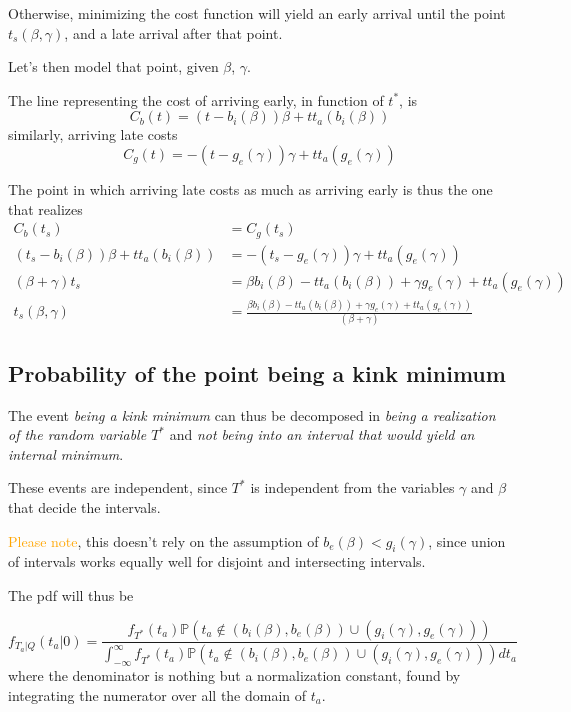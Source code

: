 \documentclass{article}
\begin{document}
Otherwise, minimizing the cost function will yield an early arrival until the point \(t_s(\beta, \gamma)\), and a late arrival after that point.

Let's then model that point, given \(\beta\), \(\gamma\).

The line representing the cost of arriving early, in function of \(t^*\), is
\begin{equation*}
  C_b(t) = (t - b_i(\beta))\beta + tt_a(b_i(\beta))
\end{equation*}
similarly, arriving late costs
\begin{equation*}
  C_g(t) = -(t - g_e(\gamma))\gamma + tt_a(g_e(\gamma))
\end{equation*}

The point in which arriving late costs as much as arriving early is thus the one that realizes
\begin{align*}
  C_b(t_s) & = C_g(t_s) \\
  (t_s - b_i(\beta))\beta + tt_a(b_i(\beta)) & = -(t_s - g_e(\gamma))\gamma + tt_a(g_e(\gamma)) \\
  (\beta + \gamma)t_s & = \beta b_i(\beta) - tt_a(b_i(\beta)) + \gamma g_e(\gamma) + tt_a(g_e(\gamma)) \\
  t_s(\beta, \gamma) & = \frac{\beta b_i(\beta) - tt_a(b_i(\beta)) + \gamma g_e(\gamma) + tt_a(g_e(\gamma))}{(\beta + \gamma)}
\end{align*}

\subsection{Probability of the point being a kink minimum}

The event \textit{being a kink minimum} can thus be decomposed in \textit{being a realization of the random variable \(T^*\)} and \textit{not being into an interval that would yield an internal minimum}.

These events are independent, since \(T^*\) is independent from the variables \(\gamma\) and \(\beta\) that decide the intervals.

\textcolor{orange}{Please note}, this doesn't rely on the assumption of \(b_e(\beta) < g_i(\gamma)\),
since union of intervals works equally well for disjoint and intersecting intervals.

The pdf will thus be

\begin{equation}
  \label{eq:prob_kink}
    f_{T_a | Q}(t_a | 0) = \frac{f_{T^*}(t_a)\mathbb{P}( t_a \not\in (b_i(\beta), b_e(\beta)) \cup (g_i(\gamma), g_e(\gamma)))}{\int_{-\infty}^\infty f_{T^*}(t_a)\mathbb{P}( t_a \not\in (b_i(\beta), b_e(\beta)) \cup (g_i(\gamma), g_e(\gamma)))dt_a}
  \end{equation}
 where the denominator is nothing but a normalization constant, found by integrating the numerator over all the domain of \(t_a\).
\end{document}
